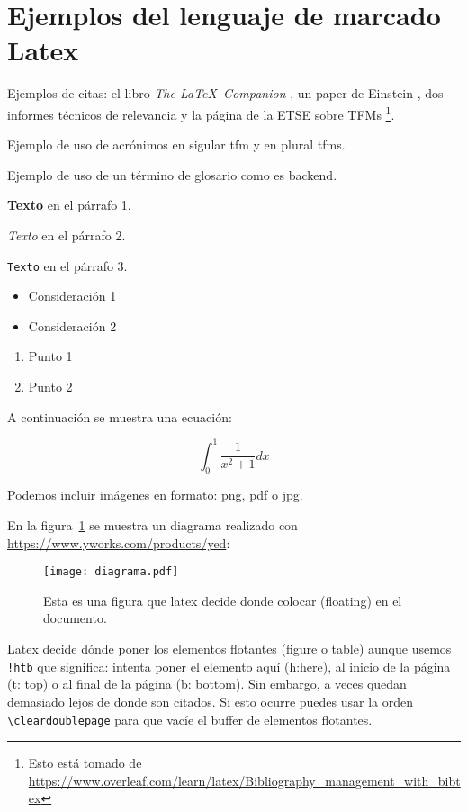 \section{Ejemplos del lenguaje de marcado Latex}

Ejemplos de citas: el libro \textit{The \LaTeX\ Companion}
\cite{latexcompanion}, un paper de Einstein \cite{einstein}, dos informes técnicos de relevancia \cite{NIST:Cloud-2011,OWASP:Top10-2017} y la página de la ETSE sobre TFMs \cite{ETSE:online}\footnote{Esto está tomado de
\url{https://www.overleaf.com/learn/latex/Bibliography_management_with_bibtex}}.

Ejemplo de uso de acrónimos en sigular \gls{tfm} y en plural \glspl{tfm}.

Ejemplo de uso de un término de glosario como es \gls{backend}.


  \textbf{Texto} en el párrafo 1.

  \textit{Texto} en el párrafo 2.

  \texttt{Texto} en el párrafo 3.


  \begin{itemize}
  \item Consideración 1
  \item Consideración 2
  \end{itemize}

  \vspace{0.5cm}

  \begin{enumerate}
  \item Punto 1
  \item Punto 2
  \end{enumerate}

A continuación se muestra una ecuación:

  \[ \int_{0}^{1}\frac{1}{x^2+1} dx \]

  Podemos incluir imágenes en formato: png, pdf o jpg.

  En la figura~\ref{fig:diagrama} se muestra un diagrama realizado con \href{yed}{https://www.yworks.com/products/yed}:

  \begin{figure}[!htb]
    \texttt{[image: diagrama.pdf]}
    \caption{Esta es una figura que latex decide donde colocar (floating) en el documento.}
    \label{fig:diagrama}
    \end{figure}

    Latex decide dónde poner los elementos flotantes (figure o table)
    aunque usemos \verb#!htb# que significa: intenta poner el elemento
    aquí (h:here), al inicio de la página (t: top) o al final de la
    página (b: bottom). Sin embargo, a veces quedan demasiado lejos de
    donde son citados. Si esto ocurre puedes usar la orden
    \verb#\cleardoublepage# para que vacíe el buffer de elementos flotantes.

